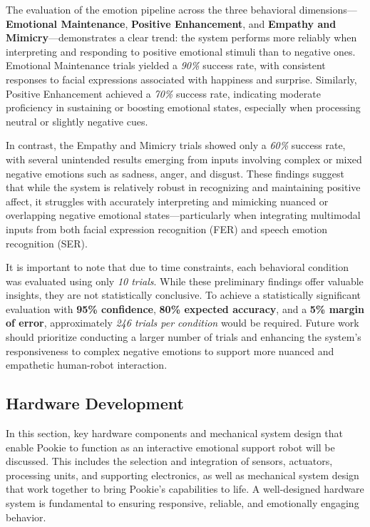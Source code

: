 The evaluation of the emotion pipeline across the three behavioral dimensions—\textbf{Emotional Maintenance}, \textbf{Positive Enhancement}, and \textbf{Empathy and Mimicry}—demonstrates a clear trend: the system performs more reliably when interpreting and responding to positive emotional stimuli than to negative ones. Emotional Maintenance trials yielded a \textit{90\%} success rate, with consistent responses to facial expressions associated with happiness and surprise. Similarly, Positive Enhancement achieved a \textit{70\%} success rate, indicating moderate proficiency in sustaining or boosting emotional states, especially when processing neutral or slightly negative cues.

In contrast, the Empathy and Mimicry trials showed only a \textit{60\%} success rate, with several unintended results emerging from inputs involving complex or mixed negative emotions such as sadness, anger, and disgust. These findings suggest that while the system is relatively robust in recognizing and maintaining positive affect, it struggles with accurately interpreting and mimicking nuanced or overlapping negative emotional states—particularly when integrating multimodal inputs from both facial expression recognition (FER) and speech emotion recognition (SER).

It is important to note that due to time constraints, each behavioral condition was evaluated using only \textit{10 trials}. While these preliminary findings offer valuable insights, they are not statistically conclusive. To achieve a statistically significant evaluation with \textbf{95\% confidence}, \textbf{80\% expected accuracy}, and a \textbf{5\% margin of error}, approximately \textit{246 trials per condition} would be required. Future work should prioritize conducting a larger number of trials and enhancing the system’s responsiveness to complex negative emotions to support more nuanced and empathetic human-robot interaction.

\subsection{Hardware Development}
In this section, key hardware components and mechanical system design that enable Pookie to function as an interactive emotional support robot will be discussed. This includes the selection and integration of sensors, actuators, processing units, and supporting electronics, as well as mechanical system design that work together to bring Pookie’s capabilities to life. A well-designed hardware system is fundamental to ensuring responsive, reliable, and emotionally engaging behavior.


